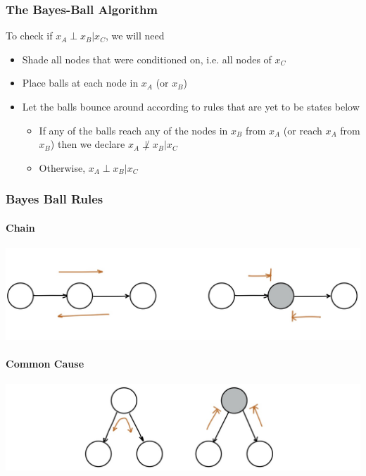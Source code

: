 \documentclass[11pt]{article}
\begin{document}
\subsubsection{The Bayes-Ball Algorithm}
To check if $x_A\perp x_B | x_C$, we will need
\begin{itemize}
    \item Shade all nodes that were conditioned on, i.e. all nodes of $x_C$
    \item Place balls at each node in $x_A$ (or $x_B$)
    \item Let the balls bounce around according to rules that are yet to be states below
    \begin{itemize}
        \item If any of the balls reach any of the nodes in $x_B$ from $x_A$ (or reach $x_A$ from $x_B$) then we declare $x_{A} \not \perp x_{B} | x_{C}$
        \item Otherwise, $x_{A} \perp x_{B} | x_{C}$
    \end{itemize}
\end{itemize}

\subsubsection{Bayes Ball Rules}
\paragraph{Chain}
\begin{center}
    \includegraphics[scale=0.25]{img/bayes_ball_chain}
\end{center}
\paragraph{Common Cause}
\begin{center}
    \includegraphics[scale=0.25]{img/bayes_ball_common_cause}
\end{center}
\end{document}
